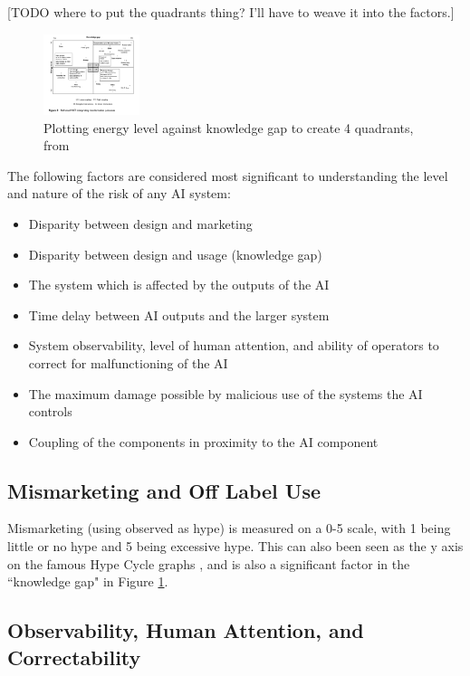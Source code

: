 \documentclass[11pt]{article}
\begin{document}
[TODO where to put the quadrants thing? I'll have to weave it into the factors.]
\begin{figure}[h]
    \centering
    \includegraphics[width=0.25\textwidth]{images/reframed-nat-2axis}
    \caption{Plotting energy level against knowledge gap to create 4 quadrants, from
    \cite{shrivastave2009normal}}
    \label{fig:quad}
\end{figure}



The following factors are considered most significant to understanding the level and nature of
the risk of any AI system:

\begin{itemize}
    \item Disparity between design and marketing
    \item Disparity between design and usage (knowledge gap)
    \item The system which is affected by the outputs of the AI
    \item Time delay between AI outputs and the larger system
    \item System observability, level of human attention, and ability of operators to correct for
            malfunctioning of the AI
    \item The maximum damage possible by malicious use of the systems the AI controls
    \item Coupling of the components in proximity to the AI component
\end{itemize}

\subsection{Mismarketing and Off Label Use}

Mismarketing (using observed as hype) is measured on a 0-5 scale, with 1 being little or no hype and
5 being excessive hype. This can also been seen as the y axis on the famous Hype Cycle graphs
\cite{oleary2008hype}, and is also a significant factor in the ``knowledge gap" in Figure
\ref{fig:quad}. 

\subsection{Observability, Human Attention, and Correctability}
\end{document}
